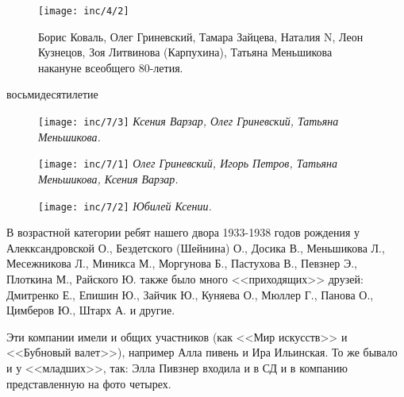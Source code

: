 \begin{figure}[h!]
    \texttt{[image: inc/4/2]}
    \caption{Борис Коваль, Олег Гриневский, Тамара Зайцева, Наталия N, Леон Кузнецов, Зоя Литвинова (Карпухина), Татьяна Меньшикова накануне всеобщего 80-летия.}
\end{figure}

\newpage

\begin{center}
{ восьмидесятилетие}
\end{center}
\vspace{-10pt}
\begin{figure}[h!]
    \begin{minipage}{80mm}
    \texttt{[image: inc/7/3]}
    \textit{\footnotesize{Ксения Варзар, Олег Гриневский, Татьяна Меньшикова.}}
    \end{minipage}
\end{figure}
\vfill
\begin{figure}[h!]
    \begin{minipage}{80mm}
    \texttt{[image: inc/7/1]}
    \textit{\footnotesize{Олег Гриневский, Игорь Петров, Татьяна Меньшикова, Ксения Варзар.}}
    \end{minipage}
\end{figure}
\vfill
\begin{figure}[h!]
    \begin{minipage}{80mm}
    \texttt{[image: inc/7/2]}
    \vspace{-5pt}
    \textit{\footnotesize{Юбилей Ксении.}}
    \end{minipage}
\end{figure}

\restoregeometry

\newpage

В возрастной категории ребят нашего двора 1933-1938 годов рождения у Алекксандровской О., Бездетского (Шейнина) О., Досика В., Меньшикова Л., Месежникова Л., Миникса М., Моргунова Б., Пастухова В., Певзнер Э., Плоткина М., Райского Ю. также было много <<приходящих>> друзей: Дмитренко Е., Епишин Ю., Зайчик Ю., Куняева О., Мюллер Г., Панова О., Цимберов Ю., Штарх А. и другие.

Эти компании имели и общих участников (как <<Мир искусств>> и <<Бубновый валет>>), например Алла пивень и Ира Ильинская. То же бывало и у <<младших>>, так: Элла Пивзнер входила и в СД и в компанию представленную на фото четырех.


